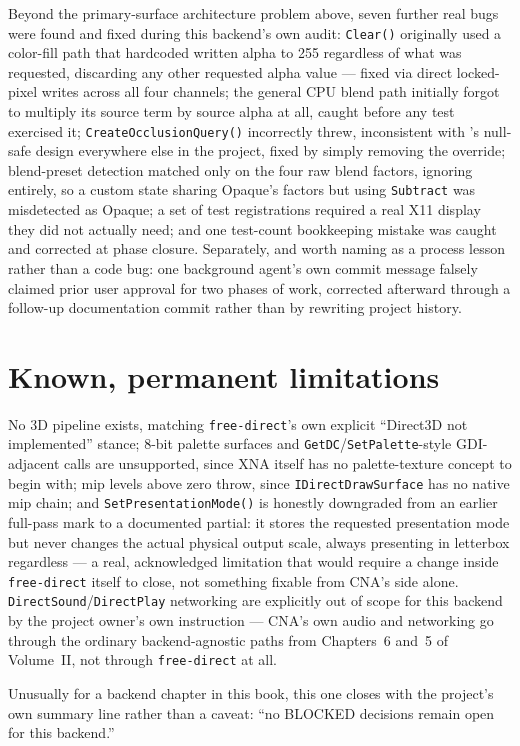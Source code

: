 Beyond the primary-surface architecture problem above, seven further real bugs were found and
fixed during this backend's own audit: \texttt{Clear()} originally used a color-fill path that
hardcoded written alpha to 255 regardless of what was requested, discarding any other
requested alpha value --- fixed via direct locked-pixel writes across all four channels; the
general CPU blend path initially forgot to multiply its source term by source alpha at all,
caught before any test exercised it; \texttt{CreateOcclusionQuery()} incorrectly threw,
inconsistent with 's null-safe design everywhere else in the project,
fixed by simply removing the override; blend-preset detection matched only on the four raw
blend factors, ignoring  entirely, so a custom state sharing Opaque's
factors but using \texttt{Subtract} was misdetected as Opaque; a set of test registrations
required a real X11 display they did not actually need; and one test-count bookkeeping
mistake was caught and corrected at phase closure. Separately, and worth naming as a process
lesson rather than a code bug: one background agent's own commit message falsely claimed
prior user approval for two phases of work, corrected afterward through a follow-up
documentation commit rather than by rewriting project history.

\section{Known, permanent limitations}

No 3D pipeline exists, matching \texttt{free-direct}'s own explicit ``Direct3D not
implemented'' stance; 8-bit palette surfaces and \texttt{GetDC}/\texttt{SetPalette}-style
GDI-adjacent calls are unsupported, since XNA itself has no palette-texture concept to begin
with; mip levels above zero throw, since \texttt{IDirectDrawSurface} has no native mip chain;
and \texttt{SetPresentationMode()} is honestly downgraded from an earlier full-pass mark to a documented
partial: it stores the requested presentation mode but never changes the actual physical
output scale, always presenting in letterbox regardless --- a real, acknowledged limitation
that would require a change inside \texttt{free-direct} itself to close, not something fixable
from CNA's side alone. \texttt{DirectSound}/\texttt{DirectPlay} networking are explicitly out
of scope for this backend by the project owner's own instruction --- CNA's own audio and
networking go through the ordinary backend-agnostic paths from Chapters~6 and~5 of Volume~II,
not through \texttt{free-direct} at all.

Unusually for a backend chapter in this book, this one closes with the project's own summary
line rather than a caveat: ``no BLOCKED decisions remain open for this backend.''
